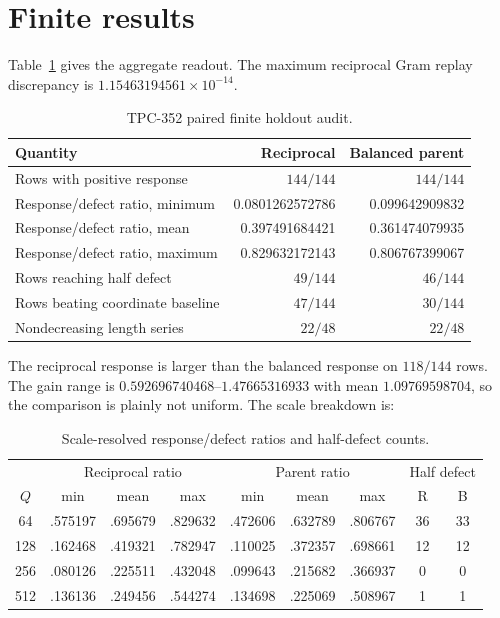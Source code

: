 \documentclass[10pt]{article}
\begin{document}
\section{Finite results}

Table~\ref{tab:overall} gives the aggregate readout.  The maximum reciprocal
Gram replay discrepancy is $1.15463194561\times10^{-14}$.

\begin{table}[t]
\centering\small
\caption{TPC-352 paired finite holdout audit.}
\label{tab:overall}
\begin{tabular}{@{}lrr@{}}
\toprule
Quantity & Reciprocal & Balanced parent\\
\midrule
Rows with positive response & $144/144$ & $144/144$\\
Response/defect ratio, minimum & 0.0801262572786 & 0.099642909832\\
Response/defect ratio, mean & 0.397491684421 & 0.361474079935\\
Response/defect ratio, maximum & 0.829632172143 & 0.806767399067\\
Rows reaching half defect & $49/144$ & $46/144$\\
Rows beating coordinate baseline & $47/144$ & $30/144$\\
Nondecreasing length series & $22/48$ & $22/48$\\
\bottomrule
\end{tabular}
\end{table}

The reciprocal response is larger than the balanced response on $118/144$
rows.  The gain range is $0.592696740468$--$1.47665316933$ with mean
$1.09769598704$, so the comparison is plainly not uniform.  The scale
breakdown is:

\begin{table}[t]
\centering\scriptsize
\caption{Scale-resolved response/defect ratios and half-defect counts.}
\label{tab:scale}
\begin{tabular}{@{}c ccc ccc cc@{}}
\toprule
 & \multicolumn{3}{c}{Reciprocal ratio} & \multicolumn{3}{c}{Parent ratio}
 & \multicolumn{2}{c}{Half defect}\\
$Q$ & min & mean & max & min & mean & max & R & B\\
\midrule
64  & .575197 & .695679 & .829632 & .472606 & .632789 & .806767 & 36 & 33\\
128 & .162468 & .419321 & .782947 & .110025 & .372357 & .698661 & 12 & 12\\
256 & .080126 & .225511 & .432048 & .099643 & .215682 & .366937 & 0 & 0\\
512 & .136136 & .249456 & .544274 & .134698 & .225069 & .508967 & 1 & 1\\
\bottomrule
\end{tabular}
\end{table}
\end{document}
